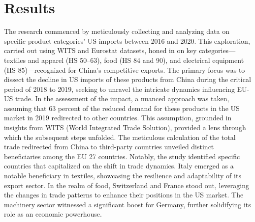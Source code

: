 \documentclass[12pt]{article}
\begin{document}
\section{Results}
\label{sec:result}
The research commenced by meticulously collecting and analyzing data on specific product categories' US imports between 2016 and 2020. This exploration, carried out using WITS and Eurostat datasets, honed in on key categories—textiles and apparel (HS 50–63), food (HS 84 and 90), and electrical equipment (HS 85)—recognized for China's competitive exports. The primary focus was to dissect the decline in US imports of these products from China during the critical period of 2018 to 2019, seeking to unravel the intricate dynamics influencing EU-US trade. In the assessment of the impact, a nuanced approach was taken, assuming that 63 percent of the reduced demand for these products in the US market in 2019 redirected to other countries. This assumption, grounded in insights from WITS (World Integrated Trade Solution), provided a lens through which the subsequent steps unfolded. The meticulous calculation of the total trade redirected from China to third-party countries unveiled distinct beneficiaries among the EU 27 countries. Notably, the study identified specific countries that capitalized on the shift in trade dynamics. Italy emerged as a notable beneficiary in textiles, showcasing the resilience and adaptability of its export sector. In the realm of food, Switzerland and France stood out, leveraging the changes in trade patterns to enhance their positions in the US market. The machinery sector witnessed a significant boost for Germany, further solidifying its role as an economic powerhouse.
\end{document}
